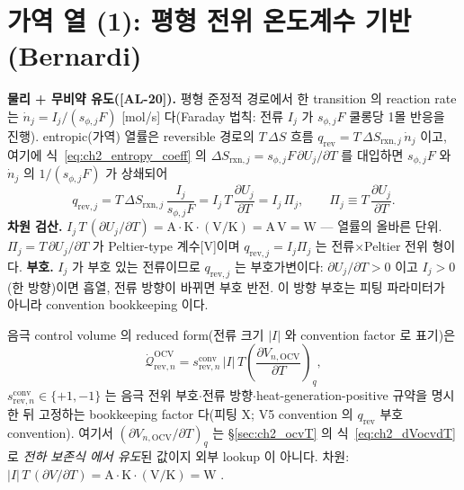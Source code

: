\documentclass[11pt,a4paper]{article}
\newcommand{\OCV}{\mathrm{OCV}}
\newcommand{\rev}{\mathrm{rev}}
\newcommand{\rxn}{\mathrm{rxn}}
\newcommand{\conv}{\mathrm{conv}}
\newcommand{\AL}[1]{\textsf{[AL-#1]}}
\begin{document}
\section{가역 열 (1): 평형 전위 온도계수 기반 (Bernardi)}\label{sec:ch2_revOCV}
\textbf{물리 + 무비약 유도(\AL{20}).} 평형 준정적 경로에서 한 transition 의 reaction rate 는
$\dot n_j=I_j/(s_{\phi,j}F)$ [mol/s] 다(Faraday 법칙: 전류 $I_j$ 가 $s_{\phi,j}F$ 쿨롱당 1몰 반응을 진행).
entropic(가역) 열률은 reversible 경로의 $T\,\Delta S$ 흐름 $q_\rev=T\,\Delta S_{\rxn,j}\,\dot n_j$ 이고, 여기에
식~\eqref{eq:ch2_entropy_coeff} 의 $\Delta S_{\rxn,j}=s_{\phi,j}F\,\partial U_j/\partial T$ 를 대입하면
$s_{\phi,j}F$ 와 $\dot n_j$ 의 $1/(s_{\phi,j}F)$ 가 상쇄되어
\begin{equation}
\boxed{\;q_{\rev,j}=T\,\Delta S_{\rxn,j}\,\frac{I_j}{s_{\phi,j}F}=I_j\,T\,\frac{\partial U_j}{\partial T}
=I_j\,\Pi_j,\qquad \Pi_j\equiv T\,\frac{\partial U_j}{\partial T}.\;}
\label{eq:ch2_qrev}
\end{equation}
\textbf{차원 검산.} $I_j\,T\,(\partial U_j/\partial T)=\mathrm A\cdot\mathrm K\cdot(\mathrm{V/K})=\mathrm{A\,V}=\mathrm W$
— 열률의 올바른 단위. $\Pi_j=T\,\partial U_j/\partial T$ 가 Peltier-type 계수[V]이며 $q_{\rev,j}=I_j\Pi_j$ 는
전류$\times$Peltier 전위 형이다. \textbf{부호.} $I_j$ 가 부호 있는 전류이므로 $q_{\rev,j}$ 는 부호가변이다:
$\partial U_j/\partial T>0$ 이고 $I_j>0$(한 방향)이면 흡열, 전류 방향이 바뀌면 부호 반전. 이 방향 부호는 피팅
파라미터가 아니라 convention bookkeeping 이다.

음극 control volume 의 reduced form(전류 크기 $|I|$ 와 convention factor 로 표기)은
\begin{equation}
\dot{\mathcal Q}_{\rev,n}^{\OCV}=s_{\rev,n}^{\conv}\,|I|\,T\left(\frac{\partial V_{n,\OCV}}{\partial T}\right)_q,
\label{eq:ch2_revOCV}
\end{equation}
$s_{\rev,n}^{\conv}\in\{+1,-1\}$ 는 음극 전위 부호$\cdot$전류 방향$\cdot$heat-generation-positive 규약을 명시한
뒤 고정하는 bookkeeping factor 다(피팅 X; V5 convention 의 $q_\rev$ 부호 convention). 여기서
$(\partial V_{n,\OCV}/\partial T)_q$ 는 \S\ref{sec:ch2_ocvT} 의 식~\eqref{eq:ch2_dVocvdT} 로 \emph{전하 보존식
에서 유도}된 값이지 외부 lookup 이 아니다. 차원: $|I|\,T\,(\partial V/\partial T)=\mathrm A\cdot\mathrm K\cdot
\mathrm{(V/K)}=\mathrm W$ \checkmark.
\end{document}
